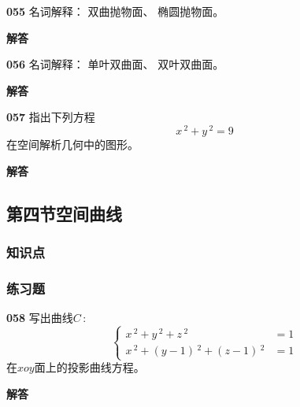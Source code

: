 \documentclass[a4paper,10pt]{article} %
\begin{document}


\textheight


\par\noindent \textbf{055} \quad 名词解释： 双曲抛物面、 椭圆抛物面。
\par\noindent \textbf{ 解答}





\textheight


\par\noindent \textbf{056} \quad 名词解释： 单叶双曲面、 双叶双曲面。
\par\noindent \textbf{ 解答}





\textheight


\par\noindent \textbf{057} \quad 指出下列方程
$$x\,^2+y\,^2=9$$
在空间解析几何中的图形。
\par\noindent \textbf{ 解答}





\textheight


\newpage
\subsection{第四节\quad 空间曲线}
\subsubsection{知识点}
\subsubsection{练习题}
\par\noindent \textbf{058} \quad 写出曲线$C$\,:
\begin{equation*}    %
 \begin{cases}
    x\,^2+y\,^2+z\,^2 & =1 \\
    x\,^2+(y-1)\,^2+(z-1)\,^2 & =1
 \end{cases}                
\end{equation*}
在$xoy$面上的投影曲线方程。
\par\noindent \textbf{ 解答}
\end{document}
